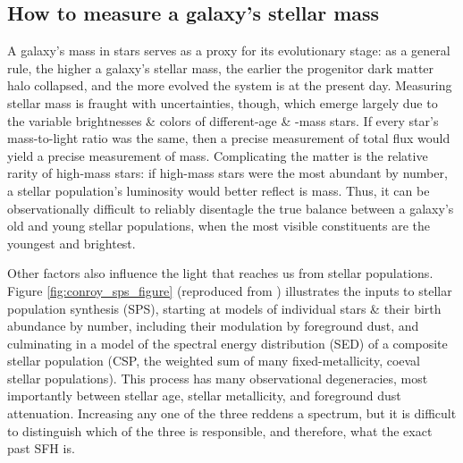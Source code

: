 \subsection{How to measure a galaxy's stellar mass}

A galaxy's mass in stars serves as a proxy for its evolutionary stage: as a general rule, the higher a galaxy's stellar mass, the earlier the progenitor dark matter halo collapsed, and the more evolved the system is at the present day. Measuring stellar mass is fraught with uncertainties, though, which emerge largely due to the variable brightnesses \& colors of different-age \& -mass stars. If every star's mass-to-light ratio was the same, then a precise measurement of total flux would yield a precise measurement of mass. Complicating the matter is the relative rarity of high-mass stars: if high-mass stars were the most abundant by number, a stellar population's luminosity would better reflect is mass. Thus, it can be observationally difficult to reliably disentagle the true balance between a galaxy's old and young stellar populations, when the most visible constituents are the youngest and brightest. 

Other factors also influence the light that reaches us from stellar populations. Figure \ref{fig:conroy_sps_figure} (reproduced from \citet{conroy_sps_review}) illustrates the inputs to stellar population synthesis (SPS), starting at models of individual stars \& their birth abundance by number, including their modulation by foreground dust, and culminating in a model of the spectral energy distribution (SED) of a composite stellar population (CSP, the weighted sum of many fixed-metallicity, coeval stellar populations). This process has many observational degeneracies, most importantly between stellar age, stellar metallicity, and foreground dust attenuation. Increasing any one of the three reddens a spectrum, but it is difficult to distinguish which of the three is responsible, and therefore, what the exact past SFH is.

